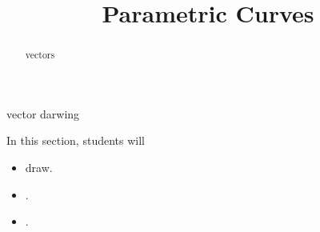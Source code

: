 \documentclass{ximera}
\title{Parametric Curves}
\begin{document}
\begin{abstract}
vectors
\end{abstract}
\maketitle




vector darwing

\begin{sectionOutcomes}
In this section, students will 

\begin{itemize}
\item draw.
\item .
\item .
\end{itemize}
\end{sectionOutcomes}
\end{document}
